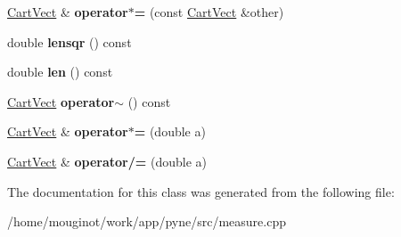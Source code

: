 \begin{DoxyCompactItemize}
\item 
\mbox{\label{class_cart_vect_ae4d813aaf367f7260870b051062a776f}} 
\hyperlink{class_cart_vect}{Cart\+Vect} \& {\bfseries operator$\ast$=} (const \hyperlink{class_cart_vect}{Cart\+Vect} \&other)
\item 
\mbox{\label{class_cart_vect_a4ca12716954a9668ceb70272696aebc7}} 
double {\bfseries lensqr} () const
\item 
\mbox{\label{class_cart_vect_aea5ac128e7effad22c6f825d99a15f9a}} 
double {\bfseries len} () const
\item 
\mbox{\label{class_cart_vect_a24e47226f90a3d0aeb9f14c6c482babc}} 
\hyperlink{class_cart_vect}{Cart\+Vect} {\bfseries operator$\sim$} () const
\item 
\mbox{\label{class_cart_vect_a3dec977a311cf363e0ce7f2983370b10}} 
\hyperlink{class_cart_vect}{Cart\+Vect} \& {\bfseries operator$\ast$=} (double a)
\item 
\mbox{\label{class_cart_vect_aaf0806de8642163882bc844e55fa921f}} 
\hyperlink{class_cart_vect}{Cart\+Vect} \& {\bfseries operator/=} (double a)
\end{DoxyCompactItemize}


The documentation for this class was generated from the following file\+:\begin{DoxyCompactItemize}
\item 
/home/mouginot/work/app/pyne/src/measure.\+cpp\end{DoxyCompactItemize}
